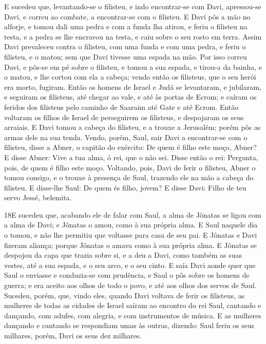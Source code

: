 E sucedeu que, levantando-se o filisteu, e indo encontrar-se com
Davi, apressou-se Davi, e correu ao combate, a encontrar-se com o
filisteu. E Davi pôs a mão no alforje, e tomou dali uma pedra
e com a funda lha atirou, e feriu o filisteu na testa, e a pedra se
lhe encravou na testa, e caiu sobre o seu rosto em terra.
Assim Davi prevaleceu contra o filisteu, com uma funda e com
uma pedra, e feriu o filisteu, e o matou; sem que Davi tivesse uma
espada na mão. Por isso correu Davi, e pôs-se em pé sobre o
filisteu, e tomou a sua espada, e tirou-a da bainha, e o matou, e
lhe cortou com ela a cabeça; vendo então os filisteus, que o seu
herói era morto, fugiram. Então os homens de Israel e Judá se
levantaram, e jubilaram, e seguiram os filisteus, até chegar ao
vale, e até às portas de Ecrom; e caíram os feridos dos filisteus
pelo caminho de Saaraim até Gate e até Ecrom. Então voltaram
os filhos de Israel de perseguirem os filisteus, e despojaram os
seus arraiais. E Davi tomou a cabeça do filisteu, e a trouxe
a Jerusalém; porém pôs as armas dele na sua tenda. Vendo,
porém, Saul, sair Davi a encontrar-se com o filisteu, disse a Abner,
o capitão do exército: De quem é filho este moço, Abner? E disse
Abner: Vive a tua alma, ó rei, que o não sei. Disse então o
rei: Pergunta, pois, de quem é filho este moço. Voltando,
pois, Davi de ferir o filisteu, Abner o tomou consigo, e o trouxe à
presença de Saul, trazendo ele na mão a cabeça do filisteu. E
disse-lhe Saul: De quem és filho, jovem? E disse Davi: Filho de teu
servo Jessé, belemita.

\medskip

\lettrine{18} E sucedeu que, acabando ele de falar com Saul, a
alma de Jônatas se ligou com a alma de Davi; e Jônatas o amou, como
à sua própria alma. E Saul naquele dia o tomou, e não lhe
permitiu que voltasse para casa de seu pai. E Jônatas e Davi
fizeram aliança; porque Jônatas o amava como à sua própria alma.
E Jônatas se despojou da capa que trazia sobre si, e a deu a
Davi, como também as suas vestes, até a sua espada, e o seu arco, e
o seu cinto. E saía Davi aonde quer que Saul o enviasse e
conduzia-se com prudência, e Saul o pôs sobre os homens de guerra; e
era aceito aos olhos de todo o povo, e até aos olhos dos servos de
Saul. Sucedeu, porém, que, vindo eles, quando Davi voltava de
ferir os filisteus, as mulheres de todas as cidades de Israel saíram
ao encontro do rei Saul, cantando e dançando, com adufes, com
alegria, e com instrumentos de música. E as mulheres dançando e
cantando se respondiam umas às outras, dizendo: Saul feriu os seus
milhares, porém, Davi os seus dez milhares.

